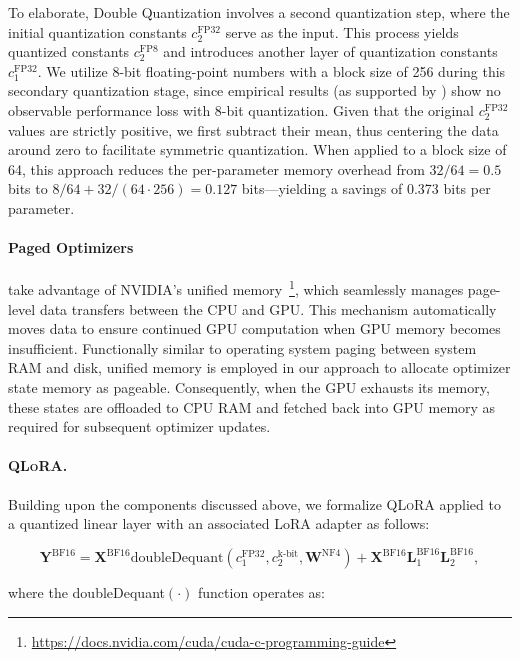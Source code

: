 To elaborate, Double Quantization involves a second quantization step, where the initial quantization constants $c_2^{\text{FP32}}$ serve as the input. This process yields quantized constants $c_2^{\text{FP8}}$ and introduces another layer of quantization constants $c_1^{\text{FP32}}$. We utilize 8-bit floating-point numbers with a block size of 256 during this secondary quantization stage, since empirical results (as supported by \citet{dettmers2022case}) show no observable performance loss with 8-bit quantization. Given that the original $c_2^{\text{FP32}}$ values are strictly positive, we first subtract their mean, thus centering the data around zero to facilitate symmetric quantization. When applied to a block size of 64, this approach reduces the per-parameter memory overhead from $32/64 = 0.5$ bits to $8/64 + 32/(64\cdot256) = 0.127$ bits—yielding a savings of 0.373 bits per parameter.

\paragraph{Paged Optimizers} take advantage of NVIDIA's unified memory~\footnote{\tiny \url{https://docs.nvidia.com/cuda/cuda-c-programming-guide}}, which seamlessly manages page-level data transfers between the CPU and GPU. This mechanism automatically moves data to ensure continued GPU computation when GPU memory becomes insufficient. Functionally similar to operating system paging between system RAM and disk, unified memory is employed in our approach to allocate optimizer state memory as pageable. Consequently, when the GPU exhausts its memory, these states are offloaded to CPU RAM and fetched back into GPU memory as required for subsequent optimizer updates.

\paragraph{\textsc{QLoRA}.} Building upon the components discussed above, we formalize \textsc{QLoRA} applied to a quantized linear layer with an associated LoRA adapter as follows:

\begin{equation}
    \mathbf{Y}^{\text{BF16}} =  \mathbf{X}^{\text{BF16}} \text{doubleDequant}(c_1^{\text{FP32}}, c_2^{\text{k-bit}}, \mathbf{W}^{\text{NF4}}) + \mathbf{X}^{\text{BF16}}\mathbf{L}^{\text{BF16}}_1\mathbf{L}^{\text{BF16}}_2,
\end{equation}

where the doubleDequant$(\cdot)$ function operates as:

